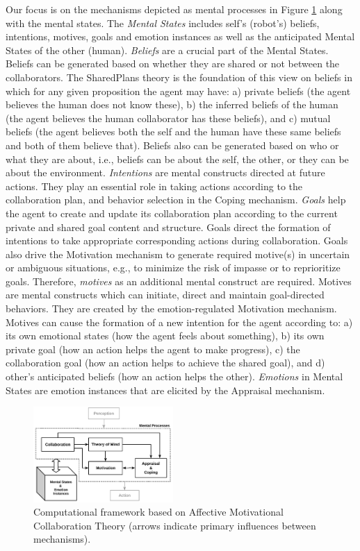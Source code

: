 \documentclass[letterpaper]{article}
\begin{document}
Our focus is on the mechanisms depicted as mental processes in Figure
\ref{fig:cpm} along with the mental states. The \textit{Mental States} includes
self's (robot's) beliefs, intentions, motives, goals and emotion instances as
well as the anticipated Mental States of the other (human). \textit{Beliefs} are
a crucial part of the Mental States. Beliefs can be generated based on whether
they are shared or not between the collaborators. The SharedPlans
\cite{grosz:shared-plans,grosz:plans-discourse} theory is the foundation of this
view on beliefs in which for any given proposition the agent may have: a)
private beliefs (the agent believes the human does not know these), b) the
inferred beliefs of the human (the agent believes the human collaborator has
these beliefs), and c) mutual beliefs (the agent believes both the self and the
human have these same beliefs and both of them believe that). Beliefs also can
be generated based on who or what they are about, i.e., beliefs can be about the
self, the other, or they can be about the environment. \textit{Intentions} are
mental constructs directed at future actions. They play an essential role in
taking actions according to the collaboration plan, and behavior selection in
the Coping mechanism. \textit{Goals} help the agent to create and update its
collaboration plan according to the current private and shared goal content and
structure. Goals direct the formation of intentions to take appropriate
corresponding actions during collaboration. Goals also drive the Motivation
mechanism to generate required motive(s) in uncertain or ambiguous situations,
e.g., to minimize the risk of impasse or to reprioritize goals. Therefore,
\textit{motives} as an additional mental construct are required. Motives are
mental constructs which can initiate, direct and maintain goal-directed
behaviors. They are created by the emotion-regulated Motivation mechanism.
Motives can cause the formation of a new intention for the agent according to:
a) its own emotional states (how the agent feels about something), b) its own
private goal (how an action helps the agent to make progress), c) the
collaboration goal (how an action helps to achieve the shared goal), and d)
other's anticipated beliefs (how an action helps the other). \textit{Emotions}
in Mental States are emotion instances that are elicited by the Appraisal
mechanism.

\vspace*{-2mm}
\begin{figure}[tbh]
  \centering
  \includegraphics[width=0.474\textwidth]{figure/theory-general-croped.pdf}
  \caption{Computational framework based on Affective Motivational Collaboration
  Theory (arrows indicate primary influences between mechanisms).}
  \label{fig:cpm}
  \vspace*{-2mm}
\end{figure}
\end{document}
